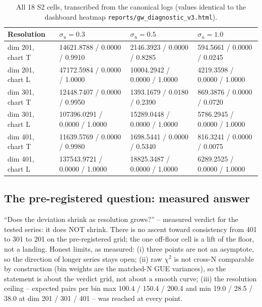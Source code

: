 \documentclass[11pt]{article}
\begin{document}
\begin{table}[htbp]\centering\small
\begin{tabular}{@{}l l l l@{}}
\toprule
Resolution & $\sigma_u = 0.3$ & $\sigma_u = 0.5$ & $\sigma_u = 1.0$ \\
\midrule
dim 201, chart T & 14621.8788 / 0.0000 / 0.9910 & 2146.3923 / 0.0000 / 0.8285 & 594.5661 / 0.0000 / 0.0245 \\
dim 201, chart L & 47172.5984 / 0.0000 / 1.0000 & 10004.2942 / 0.0000 / 1.0000 & 4219.3598 / 0.0000 / 1.0000 \\
dim 301, chart T & 12448.7407 / 0.0000 / 0.9950 & 1393.1679 / 0.0180 / 0.2390 & 869.3876 / 0.0000 / 0.0720 \\
dim 301, chart L & 107396.0291 / 0.0000 / 1.0000 & 15289.0448 / 0.0000 / 1.0000 & 5786.2945 / 0.0000 / 1.0000 \\
dim 401, chart T & 11639.5769 / 0.0000 / 0.9980 & 1698.5441 / 0.0000 / 0.5340 & 816.3241 / 0.0000 / 0.0075 \\
dim 401, chart L & 137543.9721 / 0.0000 / 1.0000 & 18825.3487 / 0.0000 / 1.0000 & 6289.2525 / 0.0000 / 1.0000 \\
\bottomrule
\end{tabular}
\caption{All 18 S2 cells, transcribed from the canonical logs (values
identical to the dashboard heatmap \texttt{reports/gw\_diagnostic\_v3.html}).}
\label{tab:grid}
\end{table}

\subsection{The pre-registered question: measured answer}
``Does the deviation shrink as resolution grows?'' -- measured verdict
for the tested series: it does NOT shrink. There is no ascent toward
consistency from 401 to 301 to 201 on the pre-registered grid; the one
off-floor cell is a lift of the floor, not a landing. Honest limits, as
measured: (i) three points are not an asymptote, so the direction of
longer series stays open; (ii) raw $\chi^2$ is not cross-N comparable by
construction (bin weights are the matched-N GUE variances), so the
statement is about the verdict grid, not about a smooth curve;
(iii) the resolution ceiling -- expected pairs per bin max 100.4 / 150.4
/ 200.4 and min 19.0 / 28.5 / 38.0 at dim 201 / 301 / 401 -- was
reached at every point.
\end{document}

